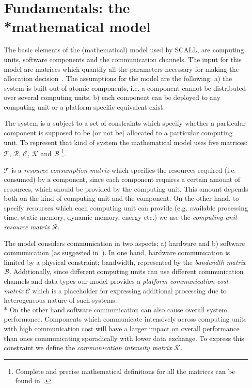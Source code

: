\documentclass{sig-alternate}
\begin{document}
\section{Fundamentals: the \\*mathematical model}
\label{sec:mmodel}

The basic elements of the (mathematical) model used by SCALL, are computing units, software components and the communication channels. The input for this model are matrices which quantify all the parameters necessary for making the allocation decision~\cite{Svogor2013}. The assumptions for the model are the following: a) the system is built out of atomic components, i.e. a component cannot be distributed over several computing units, b) each component can be deployed to any computing unit or a platform specific equivalent exist.

The system is a subject to a set of constraints which specify whether a particular component is supposed to be (or not be) allocated to a particular computing unit. To represent that kind of system the mathematical model uses five matrices: $\mathcal{T}$, $\mathcal{R}$, $\mathcal{C}$, $\mathcal{K}$ and $\mathcal{B}$ \footnote{Complete and precise mathematical definitions for all the matrices can be found in~\cite{Svogor2013}.}. 

\noindent $\mathcal{T}$ is a \textsl{resource consumption matrix} which specifies the resources required (i.e. consumed) by a component, since each component requires a certain amount of resources, which should be provided by the computing unit. This amount depends both on the kind of computing unit and the component. On the other hand, to specify resources which each computing unit can provide (e.g. available processing time, static memory, dynamic memory, energy etc.) we use the \textsl{computing unit resource matrix} $\mathcal{R}$.

\noindent The model considers communication in two aspects; a) hardware and b) software communication (as suggested in~\cite{Ristau2008}).  In one hand, hardware communication is limited by a physical constraint; bandwidth, represented by the \textsl{bandwidth matrix} $\mathcal{B}$. Additionally, since different computing units can use different communication channels and data types our model provides a \textsl{platform communication cost matrix} $\mathcal{C}$ which is a placeholder for expressing additional processing due to heterogeneous nature of such systems. 
\\*
\noindent On the other hand software communication can also cause overall system performance. Components which communicate intensively across computing units with high communication cost will have a larger impact on overall performance than ones communicating sporadically with lower data exchange. To express this constraint we define the \textsl{communication intensity matrix} $\mathcal{K}$. 
\end{document}
